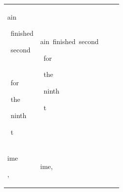 \begin{table}[h]
\begin{tabular}{ l l l l }
 \colorbox{cm_32!40}{\strut ain}\colorbox{cm_37!40}{\strut \ finished}\colorbox{cm_36!40}{\strut \ second}\colorbox{cm_40!40}{\strut \ }\colorbox{cm_50!40}{\strut \ for}\colorbox{cm_32!40}{\strut \ the}\colorbox{cm_33!40}{\strut \ ninth}\colorbox{cm_43!40}{\strut \ t} & \colorbox{cm_0!40}{\strut ain\ finished\ second\ }\colorbox{cm_12!40}{\strut \ for}\colorbox{cm_25!40}{\strut \ the}\colorbox{cm_0!40}{\strut \ ninth}\colorbox{cm_12!40}{\strut \ t} &  &  \\ 
 \colorbox{cm_43!40}{\strut ime}\colorbox{cm_34!40}{\strut ,} & \colorbox{cm_12!40}{\strut ime,} &  &  \\ 
  \hline 
    \end{tabular}
      \label{tab:data_wikisept21_paralympics}
  \end{table}